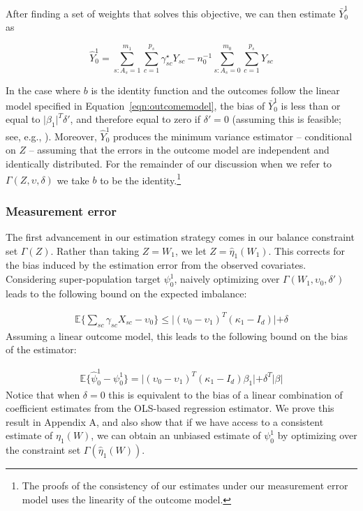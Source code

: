 \documentclass[aoas]{imsart}
\theoremstyle{plain}
\theoremstyle{remark}
\begin{document}
After finding a set of weights that solves this objective, we can then estimate $\bar{Y}_0^1$ as

\begin{equation}\label{eqn:psi}
\hat{Y}_0^1 = \sum_{s: A_s = 1}^{m_1}\sum_{c = 1}^{p_s}\gamma_{sc}^\star Y_{sc} - n_0^{-1}\sum_{s: A_s = 0}^{m_0}\sum_{c = 1}^{p_s}Y_{sc}
\end{equation}

In the case where $b$ is the identity function and the outcomes follow the linear model specified in Equation~\ref{eqn:outcomemodel}, the bias of $\bar{Y}^1_0$ is less than or equal to $\lvert\beta_1\rvert^T\delta'$, and therefore equal to zero if $\delta' = 0$ (assuming this is feasible; see, e.g., \cite{zubizarreta2015stable}). Moreover, $\hat{Y}_0^1$ produces the minimum variance estimator -- conditional on $Z$ -- assuming that the errors in the outcome model are independent and identically distributed. For the remainder of our discussion when we refer to $\Gamma(Z, \upsilon, \delta)$ we take $b$ to be the identity.\footnote{The proofs of the consistency of our estimates under our measurement error model uses the linearity of the outcome model.}

\subsubsection{Measurement error}\label{ssec:methodsmsrment}

The first advancement in our estimation strategy comes in our balance constraint set $\Gamma(Z)$. Rather than taking $Z = W_1$, we let $Z = \hat{\eta}_1(W_1)$. This corrects for the bias induced by the estimation error from the observed covariates. Considering super-population target $\psi_0^1$, naively optimizing over $\Gamma(W_1, \upsilon_0, \delta')$ leads to the following bound on the expected imbalance:

\begin{align*}
\mathbb{E}\{\sum_{sc}\gamma_{sc}X_{sc} - \upsilon_0\} \le \lvert(\upsilon_0 - \upsilon_1)^T(\kappa_1 - I_d)\lvert + \delta
\end{align*}
%
Assuming a linear outcome model, this leads to the following bound on the bias of the estimator:

\begin{align*}
\mathbb{E}\{\hat{\psi}^{1}_0 - \psi^1_0\} = \lvert(\upsilon_0 - \upsilon_1)^T(\kappa_1 - I_d)\beta_1\lvert + \delta^T\lvert\beta\lvert
\end{align*}
%
Notice that when $\delta = 0$ this is equivalent to the bias of a linear combination of coefficient estimates from the OLS-based regression estimator. We prove this result in Appendix A, and also show that if we have access to a consistent estimate of $\eta_1(W)$, we can obtain an unbiased estimate of $\psi_0^1$ by optimizing over the constraint set $\Gamma(\hat{\eta}_1(W))$.
\end{document}
